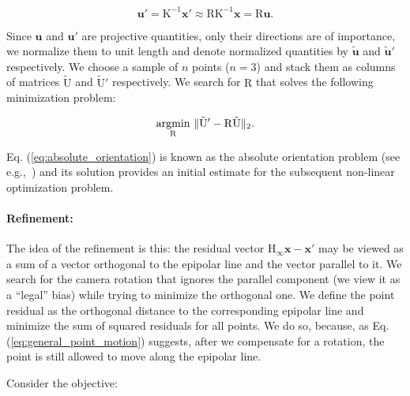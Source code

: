 \documentclass{bmvc2k}
\DeclarePairedDelimiter{\norm}{\lVert}{\rVert}
\begin{document}
\begin{equation}
  \mathbf{u'} = \mathrm{K^{-1}}\mathbf{x}' \approx \mathrm{RK^{-1}}\mathbf{x} = \mathrm{R}\mathbf{u}.
\end{equation}

Since $\mathbf{u}$ and $\mathbf{u}'$ are projective quantities, only
their directions are of importance, we normalize them to unit length
and denote normalized quantities by $\mathbf{\tilde{u}}$ and
$\mathbf{\tilde{u}}'$ respectively. We choose a sample of $n$ points
($n=3$) and stack them as columns of matrices $\mathrm{\tilde{U}}$ and
$\mathrm{\tilde{U}'}$ respectively.  We search for $\mathrm{R}$ that
solves the following minimization problem:

\begin{equation}\label{eq:absolute_orientation}
\underset{\mathrm{R}}{\text{argmin}}\ \norm{\mathrm{\tilde{U}'-R\tilde{U}}}_2.
\end{equation}

Eq. (\ref{eq:absolute_orientation}) is known as the absolute
orientation problem (see e.g.,~\cite{Horn1987}) and its solution
provides an initial estimate for the subsequent non-linear
optimization problem.

\paragraph{Refinement:} The idea of the refinement is this: the
residual vector $\mathrm{H}_\infty\mathbf{x} - \mathbf{x}'$ may be
viewed as a sum of a vector orthogonal to the epipolar line and the
vector parallel to it.  We search for the camera rotation that ignores
the parallel component (we view it as a ``legal'' bias) while trying
to minimize the orthogonal one.  We define the point residual as the
orthogonal distance to the corresponding epipolar line and minimize
the sum of squared residuals for all points.  We do so, because, as
Eq. (\ref{eq:general_point_motion}) suggests, after we compensate for
a rotation, the point is still allowed to move along the epipolar
line.

Consider the objective:
\end{document}
